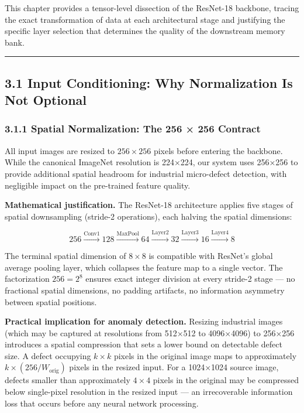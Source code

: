 This chapter provides a tensor-level dissection of the ResNet-18 backbone, tracing the exact transformation of data at each architectural stage and justifying the specific layer selection that determines the quality of the downstream memory bank.

\begin{center}\rule{0.5\linewidth}{0.5pt}\end{center}

\subsection{3.1 Input Conditioning: Why Normalization Is Not Optional}\label{input-conditioning-why-normalization-is-not-optional}

\subsubsection{3.1.1 Spatial Normalization: The 256 × 256 Contract}\label{spatial-normalization-the-256-256-contract}

All input images are resized to \(256 \times 256\) pixels before entering the backbone. While the canonical ImageNet resolution is 224×224, our system uses 256×256 to provide additional spatial headroom for industrial micro-defect detection, with negligible impact on the pre-trained feature quality.

\textbf{Mathematical justification.} The ResNet-18 architecture applies five stages of spatial downsampling (stride-2 operations), each halving the spatial dimensions:

\[256 \xrightarrow{\text{Conv1}} 128 \xrightarrow{\text{MaxPool}} 64 \xrightarrow{\text{Layer2}} 32 \xrightarrow{\text{Layer3}} 16 \xrightarrow{\text{Layer4}} 8\]

The terminal spatial dimension of \(8 \times 8\) is compatible with ResNet's global average pooling layer, which collapses the feature map to a single vector. The factorization \(256 = 2^8\) ensures exact integer division at every stride-2 stage --- no fractional spatial dimensions, no padding artifacts, no information asymmetry between spatial positions.

\textbf{Practical implication for anomaly detection.} Resizing industrial images (which may be captured at resolutions from 512×512 to 4096×4096) to 256×256 introduces a spatial compression that sets a lower bound on detectable defect size. A defect occupying \(k \times k\) pixels in the original image maps to approximately \(k \times (256/W_{\text{orig}})\) pixels in the resized input. For a 1024×1024 source image, defects smaller than approximately \(4 \times 4\) pixels in the original may be compressed below single-pixel resolution in the resized input --- an irrecoverable information loss that occurs before any neural network processing.

